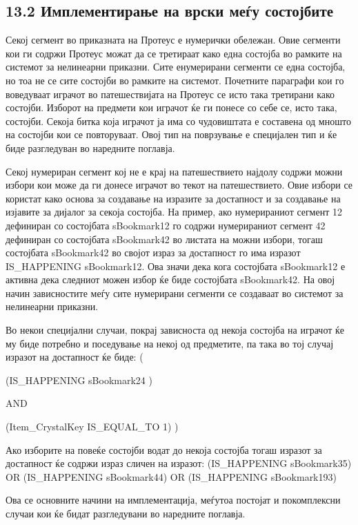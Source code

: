 \subsection{13.2 Имплементирање на врски меѓу состојбите}

Секој сегмент во приказната на Протеус е нумерички обележан. Овие сегменти кои ги содржи Протеус можат да се третираат како една состојба во рамките на системот за нелинеарни приказни. Сите енумерирани сегменти се една состојба, но тоа не се сите состојби во рамките на системот. Почетните параграфи кои го воведуваат играчот во патешествијата на Протеус се исто така третирани како состојби. Изборот на предмети кои играчот ќе ги понесе со себе се, исто така, состојби. Секоја битка која играчот ја има со чудовиштата е составена од мношто на состојби кои се повторуваат. Овој тип на поврзување е специјален тип и ќе биде разгледуван во наредните поглавја.

Секој нумериран сегмент кој не е крај на патешествието најдолу содржи можни избори кои може да ги донесе играчот во текот на патешествието. Овие избори се користат како основа за создавање на изразите за достапност и за создавање на изјавите за дијалог за секоја состојба. На пример, ако нумерираниот сегмент 12 дефиниран со состојбата sBookmark12 го содржи нумерираниот сегмент 42 дефиниран со состојбата sBookmark42 во листата на можни избори, тогаш состојбата sBookmark42 во својот израз за достапност го има изразот IS\_HAPPENING sBookmark12. Ова значи дека кога состојбата sBookmark12 е активна дека следниот можен избор ќе биде состојбата sBookmark42. На овој начин зависностите меѓу сите нумерирани сегменти се создаваат во системот за нелинеарни приказни.

Во некои специјални случаи, покрај зависноста од некоја состојба на играчот ќе му биде потребно и поседување на некој од предметите, па така во тој случај изразот на достапност ќе биде: (

(IS\_HAPPENING sBookmark24 )

AND

(Item\_CrystalKey IS\_EQUAL\_TO 1) )

Ако изборите на повеќе состојби водат до некоја состојба тогаш изразот за достапност ќе содржи израз сличен на изразот: (IS\_HAPPENING sBookmark35) OR (IS\_HAPPENING sBookmark44) OR (IS\_HAPPENING sBookmark193)

Ова се основните начини на имплементација, меѓутоа постојат и покомплексни случаи кои ќе бидат разгледувани во наредните поглавја.

